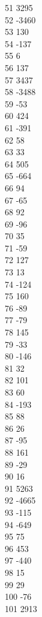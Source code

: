 { 51	3295 \\
 52	-3460 \\
 53	130 \\
 54	-137 \\
 55	6 \\
 56	137 \\
 57	3437 \\
 58	-3488 \\
 59	-53 \\
 60	424 \\
 61	-391 \\
 62	58 \\
 63	33 \\
 64	505 \\
 65	-664 \\
 66	94 \\
 67	-65 \\
 68	92 \\
 69	-96 \\
 70	35 \\
 71	-59 \\
 72	127 \\
 73	13 \\
 74	-124 \\
 75	160 \\
 76	-89 \\
 77	-79 \\
 78	145 \\
 79	-33 \\
 80	-146 \\
 81	32 \\
 82	101 \\
 83	60 \\
 84	-193 \\
 85	88 \\
 86	26 \\
 87	-95 \\
 88	161 \\
 89	-29 \\
 90	16 \\
 91	5263 \\
 92	-4665 \\
 93	-115 \\
 94	-649 \\
 95	75 \\
 96	453 \\
 97	-440 \\
 98	15 \\
 99	29 \\
 100	-76 \\
 101	2913 \\
}
